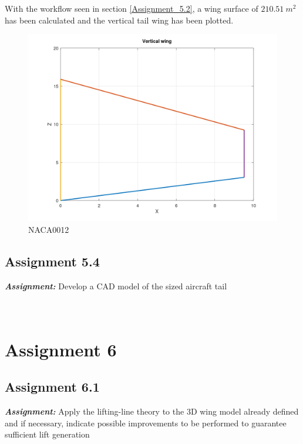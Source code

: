 \documentclass{article}
\begin{document}
With the workflow seen in section \ref{Assignment_5.2}, a wing surface of $210.51 \ m^2$ has been calculated
and the vertical tail wing has been plotted.

\begin{figure}[h!]
    \centering
    \includegraphics[width=\textwidth]{Sources/Plots_and_Pictures/Vertical_Wing.png}
    \caption{NACA0012}
    \label{vertical_wing}
\end{figure}


\clearpage

\subsection{Assignment 5.4\label{Assignment_5.4}}

\textbf{\textit{Assignment:}} Develop a CAD model 
of the sized aircraft tail \\ \\ \\ 

\clearpage

\section{Assignment 6\label{Assignment_6}}

\subsection{Assignment 6.1\label{Assignment_6.1}}

\textbf{\textit{Assignment:}} Apply the lifting-line theory to the 3D wing model already defined
and if necessary, indicate possible improvements to be performed to guarantee sufficient lift generation \\ \\ \\ 
\end{document}
